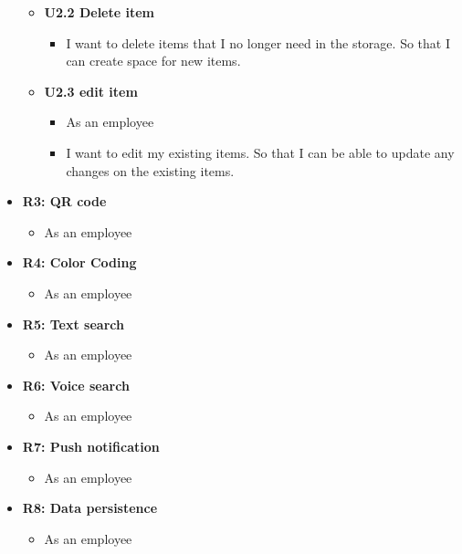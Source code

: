 \documentclass[hidelinks, 12pt, a4paper]{article}
\begin{document}
\begin{itemize}
\begin{itemize}
\begin{itemize}
        \end{itemize}
        \item \textbf{U2.2 Delete item}
        \begin{itemize}
            \item I want to delete items that I no longer need in the storage. So that I can create space for new items.
        \end{itemize}
        \item \textbf{U2.3 edit item}
        \begin{itemize}
            \item As an employee
            \item I want to edit my existing items. So that I can be able to update any changes on the existing items.
        \end{itemize}
    \end{itemize}

    \item \textbf{R3: QR code}
    \begin{itemize}
        \item As an employee
    \end{itemize}

    \item \textbf{R4: Color Coding }
    \begin{itemize}
        \item As an employee
    \end{itemize}

    \item \textbf{R5: Text search}
    \begin{itemize}
        \item As an employee
    \end{itemize}

    \item \textbf{R6: Voice search}
    \begin{itemize}
        \item As an employee
    \end{itemize}

    \item \textbf{R7: Push notification}
    \begin{itemize}
        \item As an employee
    \end{itemize}

    \item \textbf{R8: Data persistence}
    \begin{itemize}
        \item As an employee
    \end{itemize}


\end{itemize}
\end{document}

